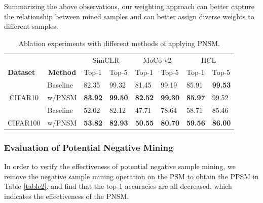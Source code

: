 \documentclass[review]{elsarticle}
\begin{document}
Summarizing the above observations, our weighting approach can better capture the relationship between mined samples and can better assign diverse weights to different samples.

\begin{table}[ht]
\caption{Ablation experiments with different methods of applying PNSM.}
\vspace{+1.0em}
\label{table3}
\begin{tabular}{llllllll}
\hline
                                &    & \multicolumn{2}{c}{SimCLR \cite{b3}} & \multicolumn{2}{c}{MoCo v2 \cite{b5}} & \multicolumn{2}{c}{HCL \cite{b20}} \\ \cline{3-8} 
  \multirow{-2}{*}{\textbf{Dataset}}                                               &  \multicolumn{1}{c}{\multirow{-2}{*}{\textbf{Method}}}        & Top-1        & Top-5       & Top-1        & Top-5        & Top-1                              & Top-5                             \\ \hline
\multicolumn{1}{c}{}                          & Baseline & 82.35        & 99.32       & 81.45        & 99.19        & 85.91                              & \textbf{99.53 }                            \\
\multicolumn{1}{c}{\multirow{-2}{*}{CIFAR10}} & w/PNSM    & \textbf{83.92}        & \textbf{99.50}       & \textbf{82.52}        & \textbf{99.30}        & \textbf{85.97}                              & 99.52                             \\ \hline
                                              & Baseline & 52.02        & 82.12       & 47.71        & 78.64        & 58.71                              & 85.46                             \\
\multirow{-2}{*}{CIFAR100}                    & w/PNSM    & \textbf{53.82 }       & \textbf{82.93}       & \textbf{50.55 }       &\textbf{80.70}        & \textbf{59.56}                              & \textbf{86.00   }                          \\ \hline
\end{tabular}
\end{table}
\subsubsection{Evaluation of Potential Negative Mining}
In order to verify the effectiveness of potential negative sample mining, we remove the negative sample mining operation on the PSM to obtain the PPSM in Table \ref{table2}, and find that the top-1 accuracies are all decreased, which indicates the effectiveness of the PNSM.
\end{document}
